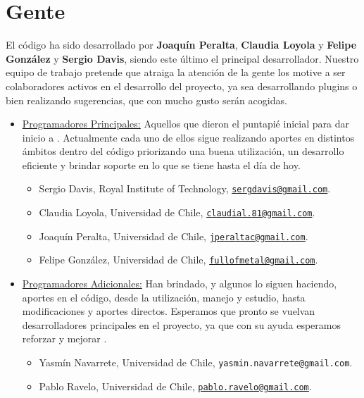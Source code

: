 \chapter{Gente}
\label{chap:auth}

El c\'odigo {\lpmd} ha sido desarrollado por \textbf{Joaqu\'in Peralta}, \textbf{Claudia Loyola} y \textbf{Felipe Gonz\'alez} y \textbf{Sergio Davis}, siendo este \'ultimo el principal desarrollador. Nuestro equipo de trabajo pretende que \lpmd atraiga la atenci\'on de la gente los motive a ser colaboradores activos en el desarrollo del proyecto, ya sea desarrollando plugins o bien realizando sugerencias, que con mucho gusto ser\'an acogidas.

\begin{itemize}

\item \underline{\sc Programadores Principales:} Aquellos que dieron el puntapi\'e inicial para dar inicio a {\lpmd}. Actualmente cada uno de ellos sigue realizando aportes en distintos \'ambitos dentro del c\'odigo priorizando una buena utilizaci\'on, un desarrollo eficiente y brindar soporte en lo que se tiene hasta el d\'ia de hoy.

\begin{itemize}
 \item Sergio Davis, Royal Institute of Technology, \href{http://www.gnm.cl/~sdavis/}{\tt sergdavis@gmail.com}.
 \item Claudia Loyola, Universidad de Chile, \href{http://www.gnm.cl/~claudial/}{\tt claudial.81@gmail.com}.
 \item Joaqu\'in Peralta, Universidad de Chile, \href{http://www.gnm.cl/~jperalta/}{\tt jperaltac@gmail.com}.
 \item Felipe Gonz\'alez, Universidad de Chile, \href{http://zeth.ciencias.uchile.cl/~fgonzalez/}{\tt fullofmetal@gmail.com}.
\end{itemize}

\item \underline{\sc Programadores Adicionales:} Han brindado, y algunos lo siguen haciendo, aportes en el c\'odigo, desde la utilizaci\'on, manejo y estudio, hasta modificaciones y aportes directos. Esperamos que pronto se vuelvan desarrolladores principales en el proyecto, ya que con su ayuda esperamos reforzar y mejorar \lpmd.

\begin{itemize}
 \item Yasm\'in Navarrete, Universidad de Chile, {\tt yasmin.navarrete@gmail.com}.
 \item Pablo Ravelo, Universidad de Chile, \href{http://zeth.ciencias.uchile.cl/~pravelo/}{\tt pablo.ravelo@gmail.com}.
\end{itemize}


\end{itemize}
